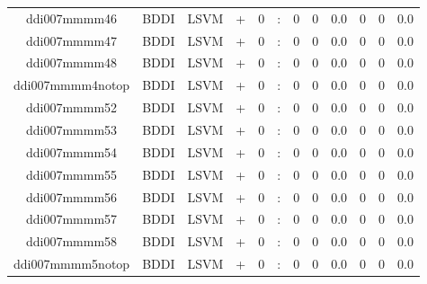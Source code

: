 \documentclass[a4paper]{article}
\begin{document}
\begin{landscape}
\begin{center}
\begin{tabular}{ |c|c|c|c|c|c|c|c|c|c|c|c|}
 
 	
 	\small{ ddi007mmmm46 } & BDDI & LSVM & +  &  0 &  :  &  0 & 0 & 0.0  &  0 & 0 & 0.0 \\
 	

 
 	
 	\small{ ddi007mmmm47 } & BDDI & LSVM & +  &  0 &  :  &  0 & 0 & 0.0  &  0 & 0 & 0.0 \\
 	

 
 	
 	\small{ ddi007mmmm48 } & BDDI & LSVM & +  &  0 &  :  &  0 & 0 & 0.0  &  0 & 0 & 0.0 \\
 	

 
 	
 	\small{ ddi007mmmm4notop } & BDDI & LSVM & +  &  0 &  :  &  0 & 0 & 0.0  &  0 & 0 & 0.0 \\
 	

 
 	
 	\small{ ddi007mmmm52 } & BDDI & LSVM & +  &  0 &  :  &  0 & 0 & 0.0  &  0 & 0 & 0.0 \\
 	

 
 	
 	\small{ ddi007mmmm53 } & BDDI & LSVM & +  &  0 &  :  &  0 & 0 & 0.0  &  0 & 0 & 0.0 \\
 	

 
 	
 	\small{ ddi007mmmm54 } & BDDI & LSVM & +  &  0 &  :  &  0 & 0 & 0.0  &  0 & 0 & 0.0 \\
 	

 
 	
 	\small{ ddi007mmmm55 } & BDDI & LSVM & +  &  0 &  :  &  0 & 0 & 0.0  &  0 & 0 & 0.0 \\
 	

 
 	
 	\small{ ddi007mmmm56 } & BDDI & LSVM & +  &  0 &  :  &  0 & 0 & 0.0  &  0 & 0 & 0.0 \\
 	

 
 	
 	\small{ ddi007mmmm57 } & BDDI & LSVM & +  &  0 &  :  &  0 & 0 & 0.0  &  0 & 0 & 0.0 \\
 	

 
 	
 	\small{ ddi007mmmm58 } & BDDI & LSVM & +  &  0 &  :  &  0 & 0 & 0.0  &  0 & 0 & 0.0 \\
 	

 
 	
 	\small{ ddi007mmmm5notop } & BDDI & LSVM & +  &  0 &  :  &  0 & 0 & 0.0  &  0 & 0 & 0.0 \\
 	


\end{tabular}
\end{center}
\end{landscape}
\end{document}
